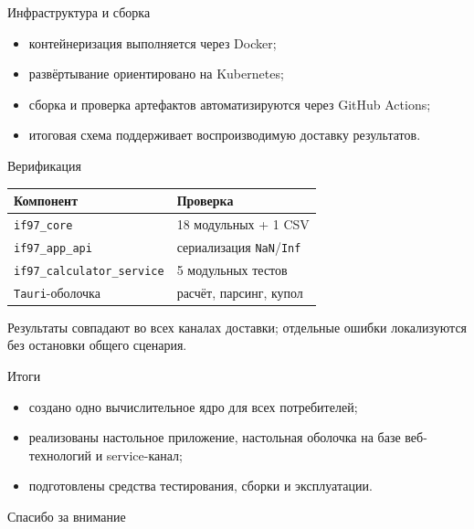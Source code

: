 \begin{frame}[t]{Инфраструктура и сборка}
\small
\begin{itemize}
  \item контейнеризация выполняется через Docker;
  \item развёртывание ориентировано на Kubernetes;
  \item сборка и проверка артефактов автоматизируются через GitHub Actions;
  \item итоговая схема поддерживает воспроизводимую доставку результатов.
\end{itemize}
\end{frame}

\begin{frame}[t]{Верификация}
\small
\begin{table}
  \centering
  \begin{tabular}{@{}ll@{}}
    \toprule
    Компонент & Проверка \\
    \midrule
    \texttt{if97\_core} & 18 модульных + 1 CSV \\
    \texttt{if97\_app\_api} & сериализация \texttt{NaN}/\texttt{Inf} \\
    \texttt{if97\_calculator\_service} & 5 модульных тестов \\
    \texttt{Tauri}-оболочка & расчёт, парсинг, купол \\
    \bottomrule
  \end{tabular}
\end{table}

Результаты совпадают во всех каналах доставки; отдельные ошибки локализуются без остановки общего сценария.
\end{frame}

\begin{frame}[t]{Итоги}
\small
\begin{itemize}
  \item создано одно вычислительное ядро для всех потребителей;
  \item реализованы настольное приложение, настольная оболочка на базе веб-технологий и service-канал;
  \item подготовлены средства тестирования, сборки и эксплуатации.
\end{itemize}

\vspace{1em}
\begin{center}
  \Large Спасибо за внимание
\end{center}
\end{frame}


